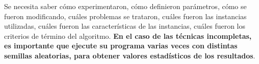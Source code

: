 Se necesita saber cómo experimentaron, cómo definieron parámetros,
cómo se fueron modificando, cuáles problemas se trataron, cuáles fueron
las instancias utilizadas, cuáles fueron las características de las
instancias, cuáles fueron los criterios de término del algoritmo.
\textbf{En el caso de las técnicas incompletas, es importante que
ejecute su programa varias veces con distintas semillas aleatorias,
para obtener valores estadísticos de los resultados}.